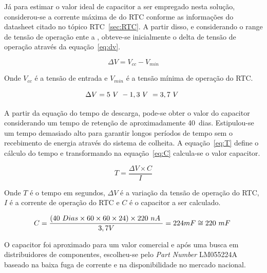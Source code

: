 Já para estimar o valor ideal de capacitor a ser empregado nesta solução, considerou-se a corrente máxima de \IRTC do RTC conforme as informações do datasheet citado no tópico RTC~\ref{sec:RTC}. A partir disso, e considerando o range de tensão de operação ente \VminRTC a \VmaxRTC, obteve-se inicialmente o delta de tensão de operação através da equação~\ref{eq:dv}.

\begin{equation}
    \Delta V = V_{cc}-V_{min}
  \label{eq:dv}
\end{equation}


Onde $V_{cc}$ é a tensão de entrada e $V_{min}$ é a tensão mínima de operação do RTC.

\begin{equation}
     \Delta V =5~V~-1,3~V~ = 3,7~V~
\end{equation}

A partir da equação do tempo de descarga, pode-se obter o valor do capacitor considerando um tempo de retenção de aproximadamente 40~dias. Estipulou-se um tempo demasiado alto para garantir longos períodos de tempo sem o recebimento de energia através do sistema de colheita. A equação~\ref{eq:T} define o cálculo do tempo e transformando na equação~\ref{eq:C} calcula-se o valor capacitor.


\begin{equation}
    T=\frac{\Delta V \times C}{I}
  \label{eq:T}
\end{equation}

Onde $T$ é o tempo em segundos, $\Delta V$ é a variação da tensão de operação do RTC, $I$ é a corrente de operação do RTC e $C$ é o capacitor a ser calculado.

\begin{equation}
    C=\frac{(40~Dias\times 60\times60\times24) \times 220~nA~}{3,7V} = 224mF \cong 220~mF~
      \label{eq:C}
\end{equation}

O capacitor foi aproximado para um valor comercial e após uma busca em distribuidores de componentes, escolheu-se pelo \textit{Part Number} LM055224A~\cite{Ohmite} baseado na baixa fuga de corrente e na disponibilidade no mercado nacional.

